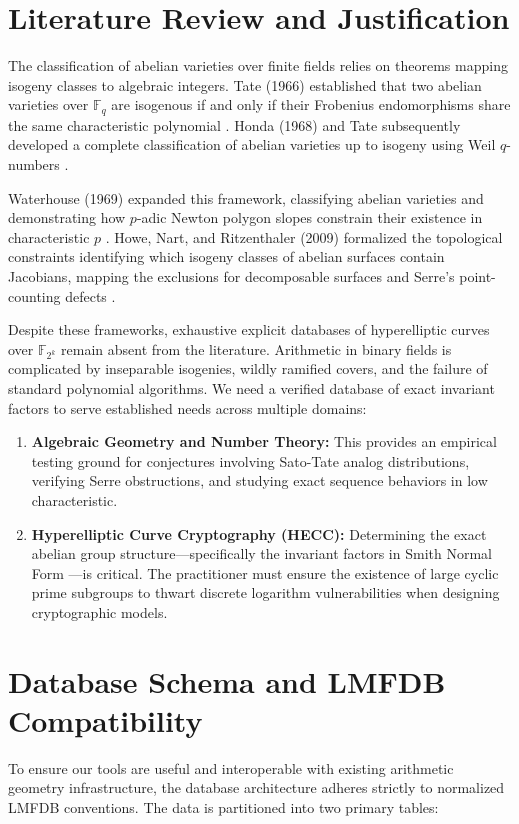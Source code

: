 \documentclass[letterpaper, 11pt]{article}
\begin{document}
\section{Literature Review and Justification}
The classification of abelian varieties over finite fields relies on theorems mapping isogeny classes to algebraic integers. Tate (1966) established that two abelian varieties over $\mathbb{F}_q$ are isogenous if and only if their Frobenius endomorphisms share the same characteristic polynomial \cite{Tate1966}. Honda (1968) and Tate subsequently developed a complete classification of abelian varieties up to isogeny using Weil $q$-numbers \cite{Honda1968}. 

Waterhouse (1969) expanded this framework, classifying abelian varieties and demonstrating how $p$-adic Newton polygon slopes constrain their existence in characteristic $p$ \cite{Waterhouse1969}. Howe, Nart, and Ritzenthaler (2009) formalized the topological constraints identifying which isogeny classes of abelian surfaces contain Jacobians, mapping the exclusions for decomposable surfaces and Serre's point-counting defects \cite{Howe2009}. 

Despite these frameworks, exhaustive explicit databases of hyperelliptic curves over $\mathbb{F}_{2^k}$ remain absent from the literature. Arithmetic in binary fields is complicated by inseparable isogenies, wildly ramified covers, and the failure of standard polynomial algorithms. We need a verified database of exact invariant factors to serve established needs across multiple domains:
\begin{enumerate}
    \item \textbf{Algebraic Geometry and Number Theory:} This provides an empirical testing ground for conjectures involving Sato-Tate analog distributions, verifying Serre obstructions, and studying exact sequence behaviors in low characteristic.
    \item \textbf{Hyperelliptic Curve Cryptography (HECC):} Determining the exact abelian group structure---specifically the invariant factors in Smith Normal Form \cite{Smith1861}---is critical. The practitioner must ensure the existence of large cyclic prime subgroups to thwart discrete logarithm vulnerabilities when designing cryptographic models.
\end{enumerate}

\section{Database Schema and LMFDB Compatibility}
To ensure our tools are useful and interoperable with existing arithmetic geometry infrastructure, the database architecture adheres strictly to normalized LMFDB conventions. The data is partitioned into two primary tables:
\end{document}

